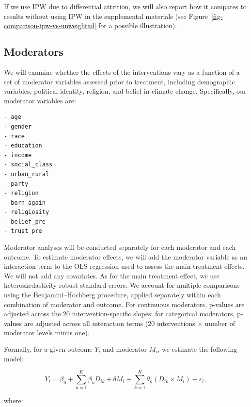 \documentclass[
  letterpaper,
  DIV=11,
  numbers=noendperiod]{scrartcl}
\begin{document}
If we use IPW due to differential attrition, we will also report how it
compares to results without using IPW in the supplemental materials (see
Figure~\ref{fig-comparison-ipw-vs-unweighted} for a possible
illustration).

\subsection{Moderators}\label{moderators}

We will examine whether the effects of the interventions vary as a
function of a set of moderator variables assessed prior to treatment,
including demographic variables, political identity, religion, and
belief in climate change. Specifically, our moderator variables are:

\begin{verbatim}
- age
- gender
- race
- education
- income
- social_class
- urban_rural
- party
- religion
- born_again
- religiosity
- belief_pre
- trust_pre
\end{verbatim}

Moderator analyses will be conducted separately for each moderator and
each outcome. To estimate moderator effects, we will add the moderator
variable as an interaction term to the OLS regression used to assess the
main treatment effects. We will not add any covariates. As for the main
treatment effect, we use heteroskedasticity-robust standard errors. We
account for multiple comparisons using the Benjamini--Hochberg
procedure, applied separately within each combination of moderator and
outcome. For continuous moderators, p-values are adjusted across the 20
intervention-specific slopes; for categorical moderators, p-values are
adjusted across all interaction terms (20 interventions × number of
moderator levels minus one).

Formally, for a given outcome \(Y_i\) and moderator \(M_i\), we estimate
the following model:

\[Y_i = \beta_0
+ \sum_{k=1}^{K} \beta_k D_{ik}
+ \delta M_i
+ \sum_{k=1}^{K} \theta_k (D_{ik} \times M_i)
+ \varepsilon_i,\]

where:
\end{document}
